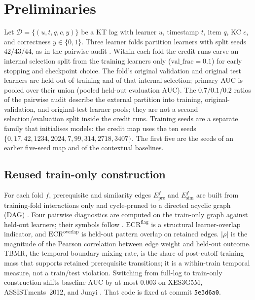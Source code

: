 \documentclass[review,12pt]{elsarticle}
\begin{document}
\section{Preliminaries}
\label{sec:prelim}

Let $\mathcal{D}=\{(u,t,q,c,y)\}$ be a KT log with learner $u$,
timestamp $t$, item $q$, KC $c$, and correctness
$y\in\{0,1\}$. Three learner folds partition learners with split seeds
$42/43/44$, as in the pairwise audit \cite{daominh2026p0}. Within each
fold the credit runs carve an internal selection split from the training
learners only ($\mathrm{val\_frac}{=}0.1$) for early stopping and
checkpoint choice. The fold's original validation and original test
learners are held out of training and of that internal selection; primary
AUC is pooled over their union (pooled held-out evaluation AUC). The
$0.7/0.1/0.2$ ratios of the pairwise audit describe the external
partition into training, original-validation, and original-test learner
pools; they are not a second selection/evaluation split inside the credit
runs. Training seeds are a separate family that initialises models: the
credit map uses the ten seeds
$\{0,17,42,1234,2024,7,99,314,2718,3407\}$. The first five are the seeds
of an earlier five-seed map and of the contextual baselines.

\subsection{Reused train-only construction}
\label{sec:p0-selfcontained}
For each fold $f$, prerequisite and similarity edges
$E_{\mathrm{pre}}^f$ and $E_{\mathrm{sim}}^f$ are built from
training-fold interactions only and cycle-pruned to a directed acyclic
graph (DAG) \cite{daominh2026p0}. Four pairwise diagnostics are
computed on the train-only graph against held-out learners; their
symbols follow \cite{daominh2026p0}.
$\mathrm{ECR}^{\mathrm{flag}}$ is a structural learner-overlap indicator,
and $\mathrm{ECR}^{\mathrm{overlap}}$ is held-out pattern overlap on
retained edges. $|\rho|$ is the magnitude of the Pearson correlation
between edge weight and held-out outcome. TBMR, the temporal boundary
mixing rate, is the share of
post-cutoff training mass that supports retained prerequisite
transitions; it is a within-train temporal measure, not a train/test
violation. Switching
from full-log to train-only construction shifts baseline AUC by at most
$0.003$ on XES3G5M, ASSISTments~2012, and Junyi \cite{daominh2026p0}.
That code is fixed at commit \texttt{5e3d6a0}.
\end{document}
